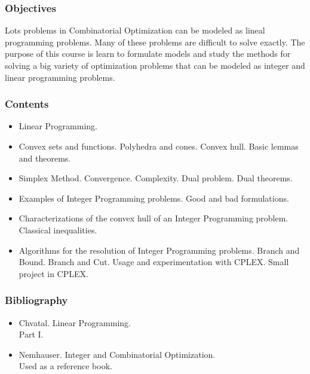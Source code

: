 \documentclass[spanish]{article}
\begin{document}
\subsubsection{Objectives}
Lots problems in Combinatorial Optimization can be modeled as lineal programming problems.
Many of these problems are difficult to solve exactly.
The purpose of this course is learn to formulate models and study the methods
for solving a big variety of optimization problems that can be modeled as
integer and linear programming problems.

\subsubsection{Contents}
\begin{itemize}
    \item Linear Programming.
    \item Convex sets and functions. Polyhedra and cones. Convex hull. Basic lemmas and theorems.
    \item Simplex Method. Convergence. Complexity. Dual problem. Dual theorems.
    \item Examples of Integer Programming problems. Good and bad formulations.
    \item Characterizations of the convex hull of an Integer Programming problem. Classical inequalities.
    \item Algorithms for the resolution of Integer Programming problems. Branch and Bound. Branch and Cut.
      Usage and experimentation with CPLEX. Small project in CPLEX.
\end{itemize}

\subsubsection{Bibliography}
\begin{itemize}
  \item Chvatal. Linear Programming.\\
    Part I.
  \item Nemhauser. Integer and Combinatorial Optimization.\\
    Used as a reference book.
\end{itemize}
\end{document}
